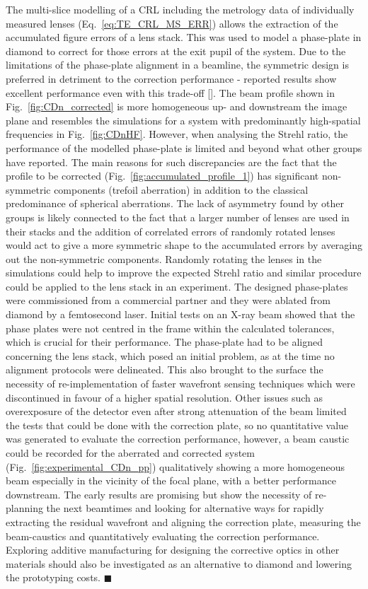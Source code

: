 \begin{refsection}
The multi-slice modelling of a CRL including the metrology data of individually measured lenses (Eq.~\ref{eq:TE_CRL_MS_ERR}) allows the extraction of the accumulated figure errors of a lens stack. This was used to model a phase-plate in diamond to correct for those errors at the exit pupil of the system. Due to the limitations of the phase-plate alignment in a beamline, the symmetric design is preferred in detriment to the correction performance - reported results show excellent performance even with this trade-off [\cite{Seiboth2020,Dhamgaye2020}]. The beam profile shown in Fig.~\ref{fig:CDn_corrected} is more homogeneous up- and downstream the image plane and resembles the simulations for a system with predominantly high-spatial frequencies in Fig.~\ref{fig:CDnHF}. However, when analysing the Strehl ratio, the performance of the modelled phase-plate is limited and beyond what other groups have reported. The main reasons for such discrepancies are the fact that the profile to be corrected (Fig.~\ref{fig:accumulated_profile_1}) has significant non-symmetric components (trefoil aberration) in addition to the classical predominance of spherical aberrations. The lack of asymmetry found by other groups is likely connected to the fact that a larger number of lenses are used in their stacks and the addition of correlated errors of randomly rotated lenses would act to give a more symmetric shape to the accumulated errors by averaging out the non-symmetric components. Randomly rotating the lenses in the simulations could help to improve the expected Strehl ratio and similar procedure could be applied to the lens stack in an experiment. The designed phase-plates were commissioned from a commercial partner and they were ablated from diamond by a femtosecond laser. Initial tests on an X-ray beam showed that the phase plates were not centred in the frame within the calculated tolerances, which is crucial for their performance. The phase-plate had to be aligned concerning the lens stack, which posed an initial problem, as at the time no alignment protocols were delineated. This also brought to the surface the necessity of re-implementation of faster wavefront sensing techniques which were discontinued in favour of a higher spatial resolution. Other issues such as overexposure of the detector even after strong attenuation of the beam limited the tests that could be done with the correction plate, so no quantitative value was generated to evaluate the correction performance, however, a beam caustic could be recorded for the aberrated and corrected system (Fig.~\ref{fig:experimental_CDn_pp}) qualitatively showing a more homogeneous beam especially in the vicinity of the focal plane, with a better performance downstream. The early results are promising but show the necessity of re-planning the next beamtimes and looking for alternative ways for rapidly extracting the residual wavefront and aligning the correction plate, measuring the beam-caustics and quantitatively evaluating the correction performance. Exploring additive manufacturing for designing the corrective optics in other materials should also be investigated as an alternative to diamond and lowering the prototyping costs. $\blacksquare$

\printbibliography[heading=subbibliography]
\end{refsection}